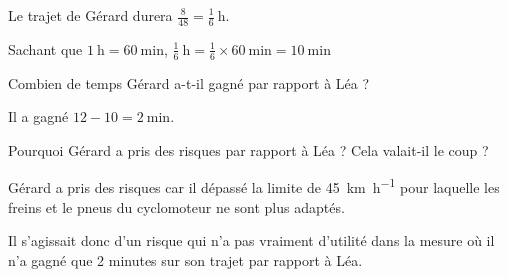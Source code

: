 \documentclass[../Cours.tex]{subfiles}
\begin{document}
\begin{questions}
{    Le trajet de Gérard durera $\frac{8}{48} = \frac{1}{6}~\unit{\hour}$.

    Sachant que $\qty{1}{\hour} = \qty{60}{\minute}$, $\frac{1}{6}~\unit{\hour} = \frac{1}{6} \times 60~\unit{\minute} = \qty{10}{\minute}$
}

\question Combien de temps Gérard a-t-il gagné par rapport à Léa ? 

{\color{rouge}
    Il a gagné $12-10=\qty{2}{\minute}$.
}

\question Pourquoi Gérard a pris des risques par rapport à Léa ? Cela valait-il le coup ?

{\color{rouge}
    Gérard a pris des risques car il dépassé la limite de \qty{45}{\kilo\metre\per\hour} pour laquelle les freins et le pneus du cyclomoteur ne sont plus adaptés.

    Il s'agissait donc d'un risque qui n'a pas vraiment d'utilité dans la mesure où il n'a gagné que 2 minutes sur son trajet par rapport à Léa.
}

\end{questions}
\end{document}
